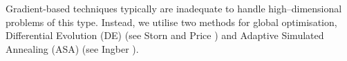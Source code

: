 \documentclass[12pt,a4paper]{article}
\renewcommand{\cite}{\citeyear}
\theoremstyle{plain}
\numberwithin{equation}{section}
\begin{document}
Gradient-based techniques typically are inadequate to handle high--dimensional problems of this type.  Instead, we utilise two methods for global optimisation, Differential Evolution (DE) (see Storn and Price \cite{Rainer:1995,Rainer:1997}) and Adaptive Simulated Annealing (ASA) (see Ingber \cite{Ingber:1996,Ingber:93}).
%
%
%
%
%
\end{document}
